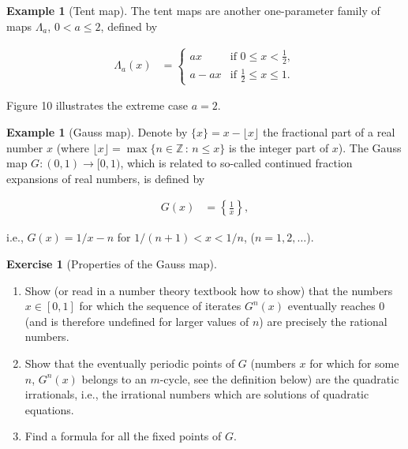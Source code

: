 \documentclass[11pt]{report}
\theoremstyle{plain}
\theoremstyle{definition}
\newtheorem{example}[thm]{Example}
\newtheorem{xexercise}[thm]{Exercise}
\begin{document}
\begin{example}[Tent map]
The tent maps are another one-parameter family of maps
$\Lambda_a$, $0<a\le 2$, defined by

\begin{align*}
\Lambda_a(x) &= \begin{cases}
ax & \textrm{if }0\le x<\tfrac12, \\ a-ax & \textrm{if }\tfrac12 \le x \le 1.
\end{cases}
\end{align*}

\noindent Figure 10 illustrates the extreme case $a=2$.
\end{example}

\begin{example}[Gauss map]
Denote by $\{ x \}=x-\lfloor x\rfloor$ the fractional
part of a real number $x$ (where
$\lfloor x\rfloor = \max\{ n\in\mathbb{Z}\,:\,n\le
x\}$
is the integer part of $x$). The Gauss map
$G:(0,1)\to[0,1)$, which is related to so-called
continued fraction expansions of real numbers, is
defined by

\begin{align*}
G(x) &= \left\{ \frac{1}{x} \right\},
\end{align*}

\noindent i.e., $G(x)=1/x-n$ for $1/(n+1)<x<1/n$,
($n=1,2,\ldots$).
\end{example}

\begin{xexercise}[Properties of the Gauss map]

\begin{enumerate}[label=\arabic*.]
\item Show (or read in a number theory textbook how to show)
that the numbers $x\in [0,1]$ for which the sequence
of iterates $G^n(x)$ eventually reaches $0$ (and is
therefore undefined for larger values of $n$) are
precisely the rational numbers.

\item Show that the eventually periodic points of $G$
(numbers $x$ for which for some $n$, $G^n(x)$ belongs
to an $m$-cycle, see the definition below) are the
quadratic irrationals, i.e., the irrational numbers
which are solutions of quadratic equations.

\item Find a formula for all the fixed points of $G$.
\end{enumerate}

\end{xexercise}
\end{document}
